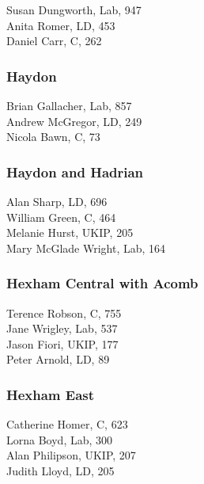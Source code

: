 \documentclass[a4paper,openany,10pt]{book}
\begin{document}


Susan Dungworth, Lab, 947\\
Anita Romer, LD, 453\\
Daniel Carr, C, 262\\


\subsubsection*{Haydon}



Brian Gallacher, Lab, 857\\
Andrew McGregor, LD, 249\\
Nicola Bawn, C, 73\\


\subsubsection*{Haydon and Hadrian}



Alan Sharp, LD, 696\\
William Green, C, 464\\
Melanie Hurst, UKIP, 205\\
Mary McGlade Wright, Lab, 164\\


\subsubsection*{Hexham Central with Acomb}



Terence Robson, C, 755\\
Jane Wrigley, Lab, 537\\
Jason Fiori, UKIP, 177\\
Peter Arnold, LD, 89\\


\subsubsection*{Hexham East}



Catherine Homer, C, 623\\
Lorna Boyd, Lab, 300\\
Alan Philipson, UKIP, 207\\
Judith Lloyd, LD, 205\\
\end{document}
